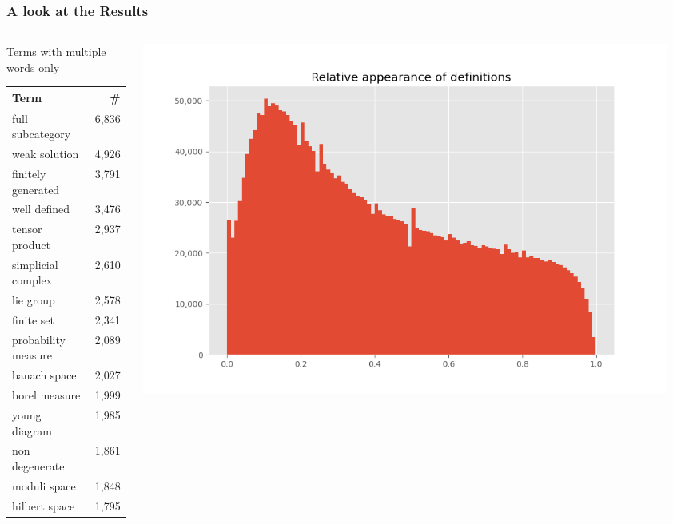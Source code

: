 \documentclass[10pt, handout]{beamer}
\begin{document}
\begin{frame}
    \frametitle{A look at the Results}
    \begin{columns}
        \begin{column}{0.4\textwidth}
            Terms with multiple words only \\
            \begin{tabular}{lr}
                \toprule
                \textbf{Term} & \textbf{\#}  \\
                \midrule
full subcategory &  6,836 \\
weak solution &  4,926 \\
finitely generated &  3,791 \\
well defined &  3,476 \\
tensor product &  2,937 \\
simplicial complex &  2,610 \\
lie group &  2,578 \\
finite set &  2,341 \\
probability measure &  2,089 \\
banach space &  2,027 \\
borel measure &  1,999 \\
young diagram &  1,985 \\
non degenerate &  1,861 \\
moduli space &  1,848 \\
hilbert space &  1,795 \\
\bottomrule
            \end{tabular}
        \end{column}
        \begin{column}{0.6\textwidth}
            \begin{center}
                \includegraphics[width=0.95\textwidth]{../Images/rel_appe.png}


\end{center}
\end{column}
\end{columns}
\end{frame}
\end{document}
